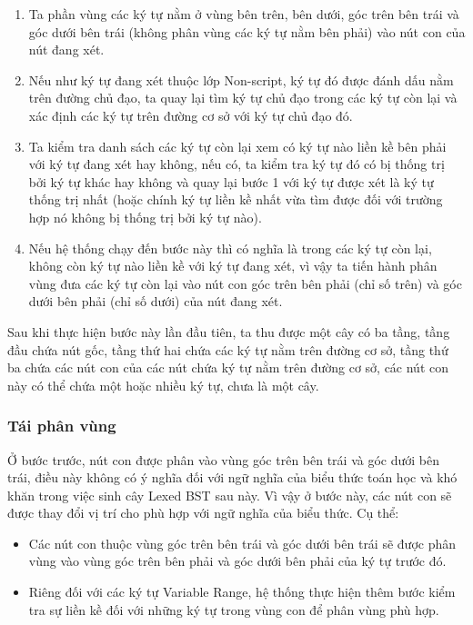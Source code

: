 \documentclass[a4paper]{article}
\theoremstyle{definition}
\begin{document}
	\begin{enumerate}
		\item Ta phần vùng các ký tự nằm ở vùng bên trên, bên dưới, góc trên bên trái và góc dưới bên trái (không phân vùng các ký tự nằm bên phải) vào nút con của nút đang xét.
		\item Nếu như ký tự đang xét thuộc lớp Non-script, ký tự đó được đánh dấu nằm trên đường chủ đạo\cite{zanibbi}, ta quay lại tìm ký tự chủ đạo\cite{zanibbi} trong các ký tự còn lại và xác định các ký tự trên đường cơ sở với ký tự chủ đạo\cite{zanibbi} đó.
		\item Ta kiểm tra danh sách các ký tự còn lại xem có ký tự nào liền kề bên phải với ký tự đang xét hay không, nếu có, ta kiểm tra ký tự đó có bị thống trị bởi ký tự khác hay không và quay lại bước 1 với ký tự được xét là ký tự thống trị nhất (hoặc chính ký tự liền kề nhất vừa tìm được đối với trường hợp nó không bị thống trị bởi ký tự nào).
		\item Nếu hệ thống chạy đến bước này thì có nghĩa là trong các ký tự còn lại, không còn ký tự nào liền kề với ký tự đang xét, vì vậy ta tiến hành phân vùng đưa các ký tự còn lại vào nút con góc trên bên phải (chỉ số trên) và góc dưới bên phải (chỉ số dưới) của nút đang xét.
	\end{enumerate}
	
	Sau khi thực hiện bước này lần đầu tiên, ta thu được một cây có ba tầng, tầng đầu chứa nút gốc, tầng thứ hai chứa các ký tự nằm trên đường cơ sở, tầng thứ ba chứa các nút con của các nút chứa ký tự nằm trên đường cơ sở, các nút con này có thể chứa một hoặc nhiều ký tự, chưa là một cây.
	
	\subsubsection*{Tái phân vùng}
	Ở bước trước, nút con được phân vào vùng góc trên bên trái và góc dưới bên trái, điều này không có ý nghĩa đối với ngữ nghĩa của biểu thức toán học và khó khăn trong việc sinh cây Lexed BST\cite{zanibbi} sau này. Vì vậy ở bước này, các nút con sẽ được thay đổi vị trí cho phù hợp với ngữ nghĩa của biểu thức. Cụ thể:
	
	\begin{itemize}
		\item Các nút con thuộc vùng góc trên bên trái và góc dưới bên trái sẽ được phân vùng vào vùng góc trên bên phải và góc dưới bên phải của ký tự trước đó.
		\item Riêng đối với các ký tự Variable Range, hệ thống thực hiện thêm bước kiểm tra sự liền kề đối với những ký tự trong vùng con để phân vùng phù hợp.
	\end{itemize}
	
\end{document}
